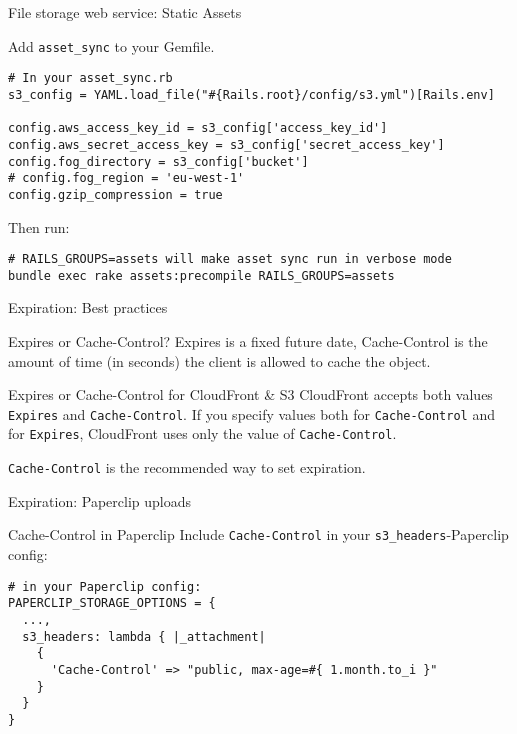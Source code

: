 \documentclass{beamer}
\begin{document}
\begin{frame}[fragile]{File storage web service: Static Assets}

Add \lstinline{asset_sync} to your Gemfile.

\begin{lstlisting}
# In your asset_sync.rb
s3_config = YAML.load_file("#{Rails.root}/config/s3.yml")[Rails.env]

config.aws_access_key_id = s3_config['access_key_id']
config.aws_secret_access_key = s3_config['secret_access_key']
config.fog_directory = s3_config['bucket']
# config.fog_region = 'eu-west-1'
config.gzip_compression = true
\end{lstlisting}

Then run:

\begin{lstlisting}
# RAILS_GROUPS=assets will make asset sync run in verbose mode
bundle exec rake assets:precompile RAILS_GROUPS=assets
\end{lstlisting}
\end{frame}


\begin{frame}[fragile]{Expiration: Best practices}
\begin{block}{Expires or Cache-Control?}
Expires is a fixed future date, Cache-Control is the amount of time (in seconds) the client is allowed to cache the object.
\end{block}
\begin{block}{Expires or Cache-Control for CloudFront \& S3}
CloudFront accepts both values \lstinline{Expires} and \lstinline{Cache-Control}. If you specify values both for \lstinline{Cache-Control} and for \lstinline{Expires}, CloudFront uses only the value of \lstinline{Cache-Control}.

\lstinline{Cache-Control} is the recommended way to set expiration.
\end{block}
\end{frame}


\begin{frame}[fragile]{Expiration: Paperclip uploads}
\begin{block}{Cache-Control in Paperclip}
Include \lstinline{Cache-Control} in your \lstinline{s3_headers}-Paperclip config:
\end{block}
\begin{lstlisting}
# in your Paperclip config:
PAPERCLIP_STORAGE_OPTIONS = {
  ...,
  s3_headers: lambda { |_attachment|
    {
      'Cache-Control' => "public, max-age=#{ 1.month.to_i }"
    }
  }
}
\end{lstlisting}
\end{frame}
\end{document}
